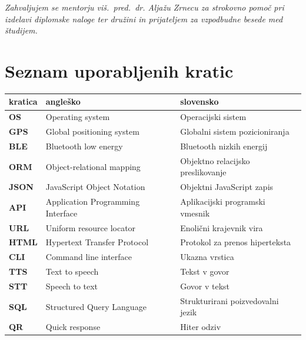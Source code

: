 \documentclass[a4paper, 12pt]{book}
\newcommand{\clearemptydoublepage}{\newpage{\pagestyle{empty}\cleardoublepage}}
\begin{document}
\vspace{2cm}

\clearemptydoublepage

\thispagestyle{empty}\mbox{}\vfill\null\it%
Zahvaljujem se mentorju viš.\ pred.\ dr.  Aljažu Zrnecu za strokovno pomoč pri izdelavi diplomske naloge ter družini in prijateljem za vzpodbudne besede med študijem.
\rm\normalfont

\clearemptydoublepage


\clearemptydoublepage

\pagestyle{empty}
\def\thepage{}%
\tableofcontents{}


\clearemptydoublepage


\chapter*{Seznam uporabljenih kratic}

\begin{tabular}{l|l|l}
  {\bf kratica} & {\bf angleško} & {\bf slovensko} \\ \hline
   {\bf OS} & Operating system & Operacijski sistem \\
   {\bf GPS} & Global positioning system & Globalni sistem pozicioniranja \\
   {\bf BLE} & Bluetooth low energy & Bluetooth nizkih energij \\
   {\bf ORM} & Object-relational mapping & Objektno relacijsko preslikovanje \\
   {\bf JSON} & JavaScript Object Notation & Objektni JavaScript zapis \\
   {\bf API} & Application Programming Interface & Aplikacijski programski vmesnik \\  
   {\bf URL} & Uniform resource locator & Enolični krajevnik vira \\
   {\bf HTML} & Hypertext Transfer Protocol & Protokol za prenos hiperteksta \\
   {\bf CLI} & Command line interface & Ukazna vrstica \\
   {\bf TTS} & Text to speech & Tekst v govor \\
   {\bf STT} & Speech to text & Govor v tekst \\
   {\bf SQL} & Structured Query Language & Strukturirani poizvedovalni jezik\\
   {\bf QR} & Quick response & Hiter odziv \\
   
\end{tabular}
\end{document}

